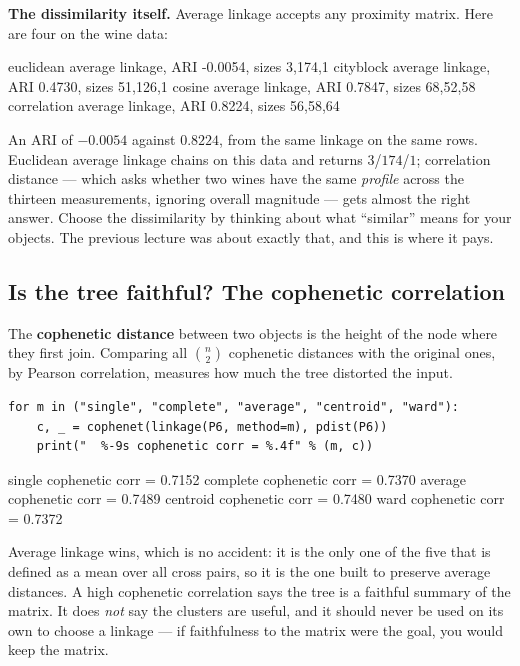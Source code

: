 \documentclass[11pt]{article}
\begin{document}
\textbf{The dissimilarity itself.} Average linkage accepts any proximity
matrix. Here are four on the wine data:

\begin{codeout}
  euclidean    average linkage, ARI -0.0054, sizes 3,174,1
  cityblock    average linkage, ARI 0.4730, sizes 51,126,1
  cosine       average linkage, ARI 0.7847, sizes 68,52,58
  correlation  average linkage, ARI 0.8224, sizes 56,58,64
\end{codeout}

An ARI of $-0.0054$ against $0.8224$, from the same linkage on the same rows.
Euclidean average linkage chains on this data and returns $3$/$174$/$1$;
correlation distance --- which asks whether two wines have the same
\emph{profile} across the thirteen measurements, ignoring overall magnitude
--- gets almost the right answer. Choose the dissimilarity by thinking about
what ``similar'' means for your objects. The previous lecture was about
exactly that, and this is where it pays.

\subsection{Is the tree faithful? The cophenetic correlation}

The \textbf{cophenetic distance} between two objects is the height of the node
where they first join. Comparing all $\binom{n}{2}$ cophenetic distances with
the original ones, by Pearson correlation, measures how much the tree
distorted the input.

\begin{lstlisting}
for m in ("single", "complete", "average", "centroid", "ward"):
    c, _ = cophenet(linkage(P6, method=m), pdist(P6))
    print("  %-9s cophenetic corr = %.4f" % (m, c))
\end{lstlisting}
\begin{codeout}
  single    cophenetic corr = 0.7152
  complete  cophenetic corr = 0.7370
  average   cophenetic corr = 0.7489
  centroid  cophenetic corr = 0.7480
  ward      cophenetic corr = 0.7372
\end{codeout}

Average linkage wins, which is no accident: it is the only one of the five
that is defined as a mean over all cross pairs, so it is the one built to
preserve average distances. A high cophenetic correlation says the tree is a
faithful summary of the matrix. It does \emph{not} say the clusters are
useful, and it should never be used on its own to choose a linkage --- if
faithfulness to the matrix were the goal, you would keep the matrix.
\end{document}
